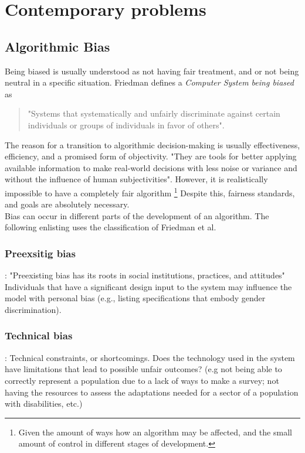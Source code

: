 \section{Contemporary problems}

\subsection{Algorithmic Bias}
\label{AlgorithmicBias}

Being biased is usually understood as not having fair treatment, and or not being neutral in a specific situation. Friedman defines a \textsl{Computer System being biased} as \begin{quote}"Systems that systematically and unfairly discriminate against certain individuals or groups of individuals in favor of others"\cite{Compsysbias}.\end{quote} The reason for a transition to algorithmic decision-making is usually effectiveness, efficiency, and a promised form of objectivity. "They are tools for better
applying available information to make real-world decisions with less noise or variance
and without the influence of human subjectivities"\cite{OBS*19}. However, it is realistically impossible to have a completely fair algorithm \footnote{Given the amount of ways how an algorithm may be affected, and the small amount of control in different stages of development.} Despite this, fairness standards, and goals are absolutely necessary.\\
Bias can occur in different parts of the development of an algorithm. The following enlisting uses the classification of Friedman et al.\cite{Compsysbias}

\subsubsection{Preexsitig bias}: \label{PreexsitingBias}
"Preexisting bias has its roots in social institutions, practices, and attitudes"\cite{Compsysbias}
Individuals that have a significant design input to the system may influence the model with personal bias (e.g., listing specifications that embody gender discrimination).
\subsubsection{Technical bias}: \label{TechnicalBias}
Technical constraints, or shortcomings. Does the technology used in the system have limitations that lead to possible unfair outcomes? (e.g not being able to correctly represent a population due to a lack of ways to make a survey; not having the resources to assess the adaptations needed for a sector of a population with disabilities, etc.)
